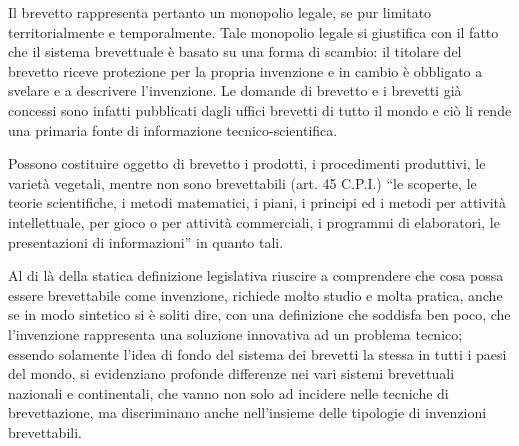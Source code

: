 Il brevetto rappresenta pertanto un monopolio legale, se pur limitato territorialmente e temporalmente. Tale monopolio legale si giustifica con il fatto che il sistema brevettuale è basato su una forma di scambio: il titolare del brevetto riceve protezione per la propria invenzione e in cambio è obbligato a svelare e a descrivere l'invenzione. Le domande di brevetto e i brevetti già concessi sono infatti pubblicati dagli uffici brevetti di tutto il mondo e ciò li rende una primaria fonte di informazione tecnico-scientifica.

Possono costituire oggetto di brevetto i prodotti, i procedimenti produttivi, le varietà vegetali, mentre non sono brevettabili (art. 45 C.P.I.) ``le scoperte, le teorie scientifiche, i metodi matematici, i piani, i principi ed i metodi per attività intellettuale, per gioco o per attività commerciali, i programmi di elaboratori, le presentazioni di informazioni'' in quanto tali. 

Al di là della statica definizione legislativa riuscire a comprendere che cosa possa essere brevettabile come invenzione, richiede molto studio e molta pratica, anche se in modo sintetico si è soliti dire, con una definizione che soddisfa ben poco, che l'invenzione rappresenta una soluzione innovativa ad un problema tecnico; essendo solamente l'idea di fondo del sistema dei brevetti la stessa in tutti i paesi del mondo, si evidenziano profonde differenze nei vari sistemi brevettuali nazionali e continentali, che vanno non solo ad incidere nelle tecniche di brevettazione, ma discriminano anche nell'insieme delle tipologie di invenzioni brevettabili.

